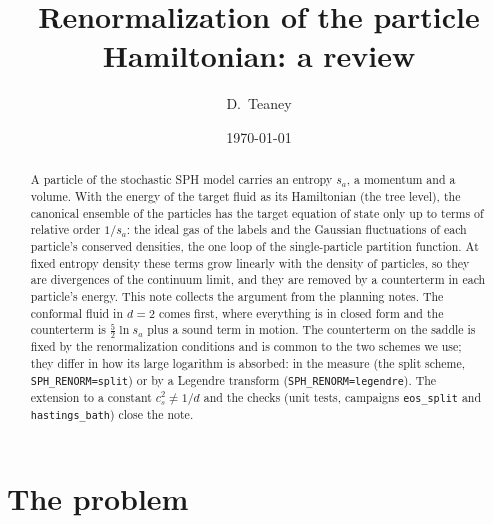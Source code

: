 \documentclass[11pt,aps,preprint,nofootinbib,superscriptaddress,tightenlines]{revtex4-2}
\begin{document}
\sloppy

\title{Renormalization of the particle Hamiltonian: a review}
\author{D.~Teaney}
\date{\today}

\begin{abstract}
A particle of the stochastic SPH model carries an entropy $s_a$, a momentum and a volume.  With the energy of the target fluid as its Hamiltonian
(the tree level), the canonical ensemble of the particles has the target equation of state only up to terms of relative order $1/s_a$: the ideal
gas of the labels and the Gaussian fluctuations of each particle's conserved densities, the one loop of the single-particle partition function.
At fixed entropy density these terms grow linearly with the density of particles, so they are divergences of the continuum limit, and they are
removed by a counterterm in each particle's energy.  This note collects the argument from the planning notes.  The conformal fluid in $d=2$ comes
first, where everything is in closed form and the counterterm is $\tfrac52\ln s_a$ plus a sound term in motion.  The counterterm on the saddle
is fixed by the renormalization conditions and is common to the two schemes we use; they differ in how its large logarithm is absorbed: in the
measure (the split scheme, \texttt{SPH\_RENORM=split}) or by a Legendre transform (\texttt{SPH\_RENORM=legendre}).  The extension to a constant
$c_s^2\neq1/d$ and the checks (unit tests, campaigns \texttt{eos\_split} and \texttt{hastings\_bath}) close the note.
\end{abstract}

\maketitle
\tableofcontents

\section{The problem}
\label{sec:problem}
\end{document}
